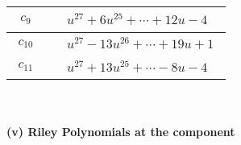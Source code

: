 \documentclass[1p]{elsarticle_modified}
\theoremstyle{definition}
\begin{document}
\begin{tabular}{m{50pt}|m{274pt}}
\hline $$\begin{aligned}c_{9}\end{aligned}$$&$\begin{aligned}
&u^{27}+6 u^{25}+\cdots+12 u-4
\end{aligned}$\\
\hline $$\begin{aligned}c_{10}\end{aligned}$$&$\begin{aligned}
&u^{27}-13 u^{26}+\cdots+19 u+1
\end{aligned}$\\
\hline $$\begin{aligned}c_{11}\end{aligned}$$&$\begin{aligned}
&u^{27}+13 u^{25}+\cdots-8 u-4
\end{aligned}$\\
\hline
\end{tabular}\\~\\
\newpage\renewcommand{\arraystretch}{1}
\flushleft \textbf{(v) Riley Polynomials at the component}\newline \\
\end{document}
